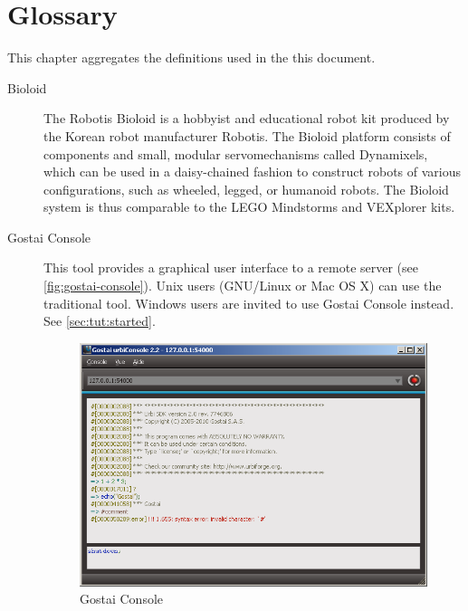 
\chapter{Glossary}
\label{sec:glossary}

This chapter aggregates the definitions used in the this document.

\begin{description}
\item[Bioloid] The Robotis Bioloid is a hobbyist and educational robot kit
  produced by the Korean robot manufacturer Robotis. The Bioloid platform
  consists of components and small, modular servomechanisms called
  Dynamixels, which can be used in a daisy-chained fashion to construct
  robots of various configurations, such as wheeled, legged, or humanoid
  robots. The Bioloid system is thus comparable to the LEGO Mindstorms and
  VEXplorer kits.

\item[Gostai Console] This tool provides a graphical user interface to a
  remote \urbi server (see \autoref{fig:gostai-console}).  Unix users
  (GNU/Linux or Mac OS X) can use the traditional  tool.
  Windows users are invited to use Gostai Console instead.  See
  \autoref{sec:tut:started}.

  \begin{figure}[htp]
    \centering
    \includegraphics[width=.8\linewidth]{img/urbi-console}
    \caption{Gostai Console}
    \label{fig:gostai-console}
  \end{figure}



\end{description}
